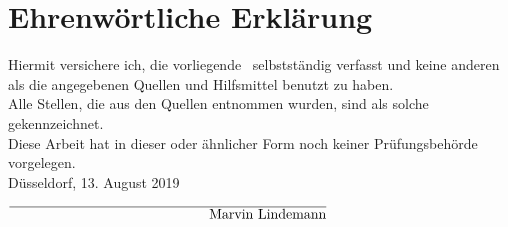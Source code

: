 
\chapter{Ehrenw\"ortliche Erkl\"arung}

Hiermit versichere ich, die vorliegende \Typ \ selbstst\"andig verfasst und keine anderen als die angegebenen Quellen und Hilfsmittel benutzt zu haben.\\

\noindent Alle Stellen, die aus den Quellen entnommen wurden, sind als solche gekennzeichnet.\\

\noindent Diese Arbeit hat in dieser oder \"ahnlicher Form noch keiner Pr\"ufungsbeh\"orde vorgelegen. \\

\vspace{8cm}
\noindent D\"usseldorf, 13. August 2019%
\begin{flushright}
$\overline{\text{~~~~~~~~~~~~~~~~~~~~~~~~~~~~~~~~~~~~~~~~~~~Marvin Lindemann}}$
\end{flushright}